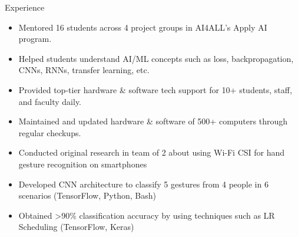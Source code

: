 \documentclass{resume} %
\begin{document}
\begin{workSection}{Experience}
    \experienceItem[
        company=AI4ALL,
        location=Remote,
        position=Student Coordinator,
        duration=August 2023 {-} present
    ]
    \begin{itemize}
        \vspace{-0.5em}
        \itemsep -6pt {}
        \item Mentored 16 students across 4 project groups in AI4ALL's Apply AI program.
        \item Helped students understand AI/ML concepts such as loss, backpropagation, CNNs, RNNs, transfer learning, etc.
    \end{itemize}
    \experienceItem[
        company=UTEP,
        location=El Paso{,} TX,
        position=Computer Lab Assistant,
        duration=January 2023 {-} present
    ]
    \begin{itemize}
        \vspace{-0.5em}
        \itemsep -6pt {}
        \item Provided top-tier hardware \& software tech support for 10+ students, staff, and faculty daily.
        \item Maintained and updated hardware \& software of 500+ computers through regular checkups.
    \end{itemize}
    \experienceItem[
    company=Temple University,
    location=Philadelphia{,} PA,
    position=Undergraduate Researcher,
    duration=June {-} July 2023
    ]
    \begin{itemize}
        \vspace{-0.5em}
        \itemsep -6pt {}
        \item Conducted original research in team of 2 about using Wi-Fi CSI for hand gesture recognition on smartphones
        \item Developed CNN architecture to classify 5 gestures from 4 people in 6 scenarios (TensorFlow, Python, Bash)
        \item Obtained >90\% classification accuracy by using techniques such as LR Scheduling (TensorFlow, Keras)
    \end{itemize}

\end{workSection}
\end{document}
